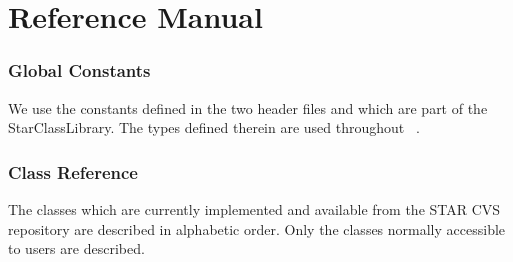\part{Reference Manual}
\label{refman}
\clearpage


\section{Global Constants}

We use the constants defined in the two header files
  and
 which are part of the StarClassLibrary.
The types defined therein are used
throughout \StMcEvent\ .



\section{Class Reference}
The classes which are currently implemented and available from the
STAR CVS repository are described in alphabetic order.  Only the
classes normally accessible to users are described.

\clearpage


%
%
